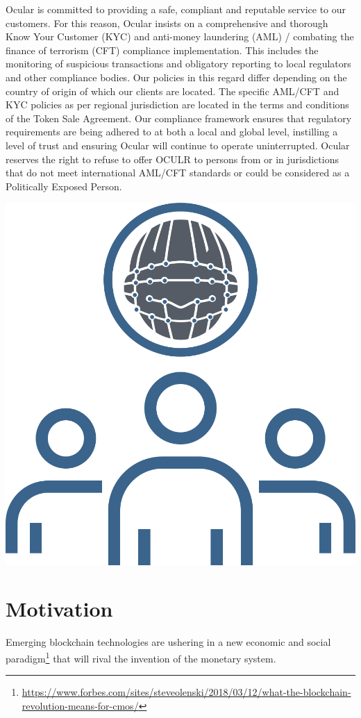\documentclass[a4paper]{article}
\begin{document}
Ocular is committed to providing a safe, compliant and reputable service to our customers. For this reason, Ocular insists on a comprehensive and thorough Know Your Customer (KYC) and anti-money laundering (AML) / combating the finance of terrorism (CFT) compliance implementation. This includes the monitoring of suspicious transactions and obligatory reporting to local regulators and other compliance bodies. Our policies in this regard differ depending on the country of origin of which our clients are located. The specific AML/CFT and KYC policies as per regional jurisdiction are located in the terms and conditions of the Token Sale Agreement. Our compliance framework ensures that regulatory requirements are being adhered to at both a local and global level, instilling a level of trust and ensuring Ocular will continue to operate uninterrupted. Ocular reserves the right to refuse to offer OCULR to persons from or in jurisdictions that do not meet international AML/CFT standards or could be considered as a Politically Exposed Person.
\clearpage
\centerline{\includegraphics[width=1.0\textwidth]{ocular-kyc-aml}}

\section{Motivation}
Emerging blockchain technologies are ushering in a new economic and social paradigm\footnote{\url{https://www.forbes.com/sites/steveolenski/2018/03/12/what-the-blockchain-revolution-means-for-cmos/}} that will rival the invention of the monetary system. 
\end{document}
